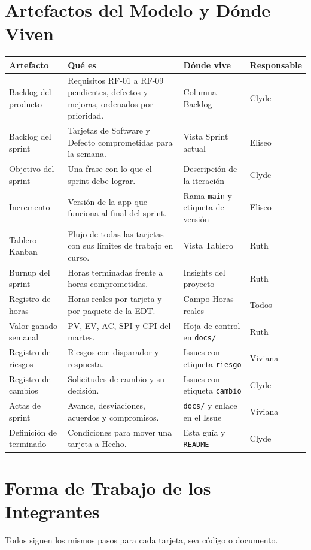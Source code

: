 \documentclass[11pt,a4paper]{article}
\begin{document}
\section{Artefactos del Modelo y Dónde Viven}
{\small
{}
\noindent\begin{tabularx}{\textwidth}{@{}P{3.2cm} L P{3.1cm} P{2.0cm}@{}}
\toprule
{}
\textbf{Artefacto} & \textbf{Qué es} & \textbf{Dónde vive} & \textbf{Responsable} \\
\midrule
Backlog del producto & Requisitos RF-01 a RF-09 pendientes, defectos y mejoras, ordenados por prioridad. & Columna Backlog & Clyde \\
Backlog del sprint & Tarjetas de Software y Defecto comprometidas para la semana. & Vista Sprint actual & Eliseo \\
Objetivo del sprint & Una frase con lo que el sprint debe lograr. & Descripción de la iteración & Clyde \\
Incremento & Versión de la app que funciona al final del sprint. & Rama \texttt{main} y etiqueta de versión & Eliseo \\
Tablero Kanban & Flujo de todas las tarjetas con sus límites de trabajo en curso. & Vista Tablero & Ruth \\
Burnup del sprint & Horas terminadas frente a horas comprometidas. & Insights del proyecto & Ruth \\
Registro de horas & Horas reales por tarjeta y por paquete de la EDT. & Campo Horas reales & Todos \\
Valor ganado semanal & PV, EV, AC, SPI y CPI del martes. & Hoja de control en \texttt{docs/} & Ruth \\
Registro de riesgos & Riesgos con disparador y respuesta. & Issues con etiqueta \texttt{riesgo} & Viviana \\
Registro de cambios & Solicitudes de cambio y su decisión. & Issues con etiqueta \texttt{cambio} & Clyde \\
Actas de sprint & Avance, desviaciones, acuerdos y compromisos. & \texttt{docs/} y enlace en el Issue & Viviana \\
Definición de terminado & Condiciones para mover una tarjeta a Hecho. & Esta guía y \texttt{README} & Clyde \\
\bottomrule
\end{tabularx}
}

\section{Forma de Trabajo de los Integrantes}
Todos siguen los mismos pasos para cada tarjeta, sea código o documento.
\end{document}
